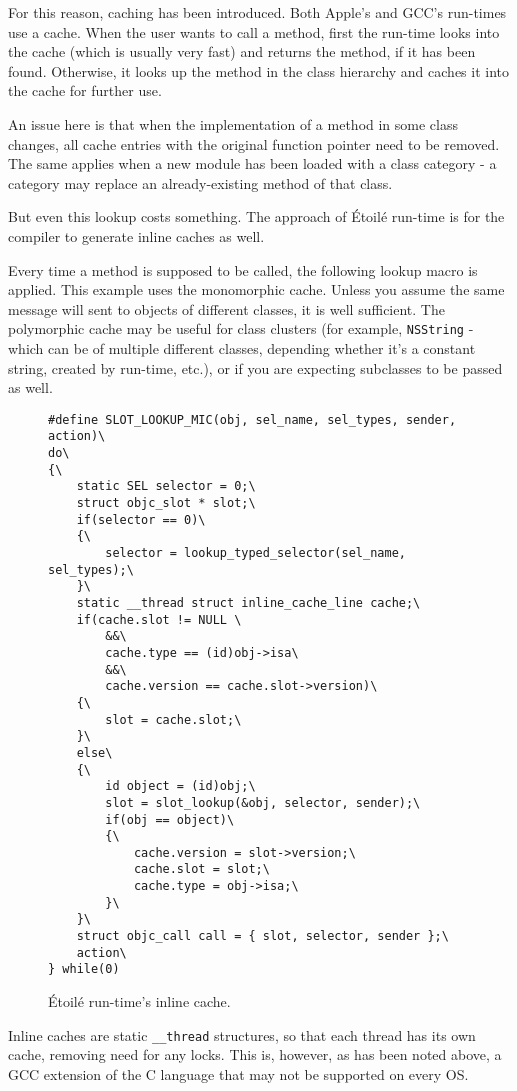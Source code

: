 For this reason, caching has been introduced. Both Apple's and GCC's run-times use a cache. When the user wants to call a method, first the run-time looks into the cache (which is usually very fast) and returns the method, if it has been found. Otherwise, it looks up the method in the class hierarchy and caches it into the cache for further use.

An issue here is that when the implementation of a method in some class changes, all cache entries with the original function pointer need to be removed. The same applies when a new module has been loaded with a class category - a category may replace an already-existing method of that class.

But even this lookup costs something. The approach of \'Etoil\'e run-time is for the compiler to generate inline caches as well.

Every time a method is supposed to be called, the following lookup macro is applied. This example uses the monomorphic cache. Unless you assume the same message will sent to objects of different classes, it is well sufficient. The polymorphic cache may be useful for class clusters (for example, \verb=NSString= - which can be of multiple different classes, depending whether it's a constant string, created by run-time, etc.), or if you are expecting subclasses to be passed as well.

\begin{figure}[H]
\begin{verbatim}
#define SLOT_LOOKUP_MIC(obj, sel_name, sel_types, sender, action)\
do\
{\
    static SEL selector = 0;\
    struct objc_slot * slot;\
    if(selector == 0)\
    {\
        selector = lookup_typed_selector(sel_name, sel_types);\
    }\
    static __thread struct inline_cache_line cache;\
    if(cache.slot != NULL \
        &&\
        cache.type == (id)obj->isa\
        &&\
        cache.version == cache.slot->version)\
    {\
        slot = cache.slot;\
    }\
    else\
    {\
        id object = (id)obj;\
        slot = slot_lookup(&obj, selector, sender);\
        if(obj == object)\
        {\
            cache.version = slot->version;\
            cache.slot = slot;\
            cache.type = obj->isa;\
        }\
    }\
    struct objc_call call = { slot, selector, sender };\
    action\
} while(0)
\end{verbatim}
  \centering{}
  \caption{\'Etoil\'e run-time's inline cache.}
  \label{fig:etoile_inline_cache}
\end{figure}


Inline caches are static \verb=__thread= structures, so that each thread has its own cache, removing need for any locks. This is, however, as has been noted above, a GCC extension of the C language that may not be supported on every OS.

